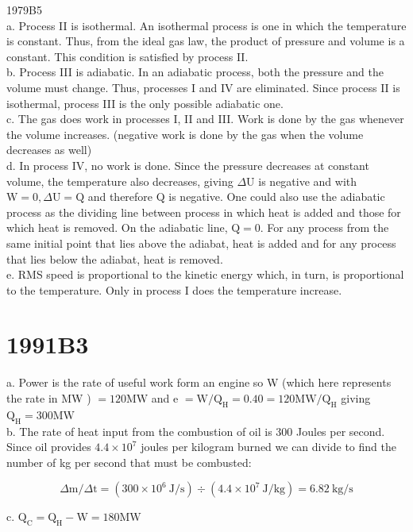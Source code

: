 \begin{enumerate}
1979B5\\
a. Process II is isothermal. An isothermal process is one in which the temperature is constant. Thus, from the ideal gas law, the product of pressure and volume is a constant. This condition is satisfied by process II.\\
b. Process III is adiabatic. In an adiabatic process, both the pressure and the volume must change. Thus, processes I and IV are eliminated. Since process II is isothermal, process III is the only possible adiabatic one.\\
c. The gas does work in processes I, II and III. Work is done by the gas whenever the volume increases. (negative work is done by the gas when the volume decreases as well)\\
d. In process IV, no work is done. Since the pressure decreases at constant volume, the temperature also decreases, giving $\Delta \mathrm{U}$ is negative and with $\mathrm{W}=0, \Delta \mathrm{U}=\mathrm{Q}$ and therefore Q is negative. One could also use the adiabatic process as the dividing line between process in which heat is added and those for which heat is removed. On the adiabatic line, $\mathrm{Q}=0$. For any process from the same initial point that lies above the adiabat, heat is added and for any process that lies below the adiabat, heat is removed.\\
e. RMS speed is proportional to the kinetic energy which, in turn, is proportional to the temperature. Only in process I does the temperature increase.

\section*{1991B3}
a. Power is the rate of useful work form an engine so W (which here represents the rate in MW ) $=120 \mathrm{MW}$ and e $=\mathrm{W} / \mathrm{Q}_{\mathrm{H}}=0.40=120 \mathrm{MW} / \mathrm{Q}_{\mathrm{H}}$ giving $\mathrm{Q}_{\mathrm{H}}=300 \mathrm{MW}$\\
b. The rate of heat input from the combustion of oil is 300 Joules per second. Since oil provides $4.4 \times 10^{7}$ joules per kilogram burned we can divide to find the number of kg per second that must be combusted:

$$
\Delta \mathrm{m} / \Delta \mathrm{t}=\left(300 \times 10^{6} \mathrm{~J} / \mathrm{s}\right) \div\left(4.4 \times 10^{7} \mathrm{~J} / \mathrm{kg}\right)=6.82 \mathrm{~kg} / \mathrm{s}
$$

c. $\mathrm{Q}_{\mathrm{C}}=\mathrm{Q}_{\mathrm{H}}-\mathrm{W}=180 \mathrm{MW}$


\end{enumerate}
